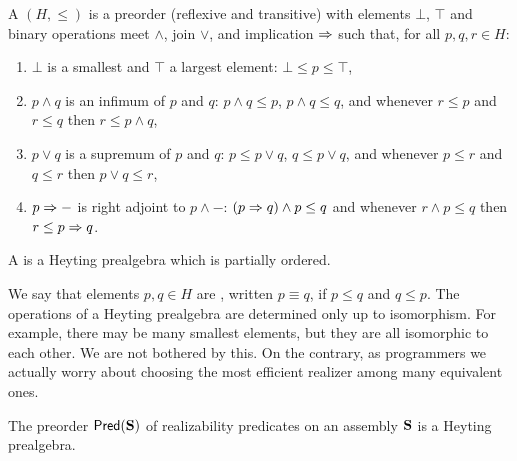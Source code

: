 \begin{definition}
  A  $(H, {\leq})$ is a preorder (reflexive
  and transitive) with elements $\bot$, $\top$ and binary operations
  meet $\land$, join $\lor$, and implication $\Rightarrow$ such that, for all
  $p, q, r \in H$:
  \begin{enumerate}
  \item $\bot$ is a smallest and $\top$ a largest element: $\bot \leq
    p \leq \top$,
  \item $p \land q$ is an infimum of $p$ and $q$: $p \land q \leq p$,
    $p \land q \leq q$, and whenever $r \leq p$ and $r \leq q$ then $r
    \leq p \land q$,
  \item $p \lor q$ is a supremum of $p$ and $q$: $p \leq p \lor q$, $q
    \leq p \lor q$, and whenever $p \leq r$ and $q \leq r$ then $p
    \lor q \leq r$,
  \item $p \Rightarrow {-}$ is right adjoint to $p \land {-}$: $(p \Rightarrow q)
    \land p \leq q$ and whenever $r \land p \leq q$ then $r \leq p
    \Rightarrow q$.
  \end{enumerate}
  A  is a Heyting prealgebra which is partially
  ordered.
\end{definition}

We say that elements $p, q \in H$ are , written $p
\equiv q$, if $p \leq q$ and $q \leq p$. The operations of a Heyting
prealgebra are determined only up to isomorphism. For example, there
may be many smallest elements, but they are all isomorphic to each
other. We are not bothered by this. On the contrary, as programmers we
actually worry about choosing the most efficient realizer among many
equivalent ones.

\begin{proposition}
  The preorder $\mathsf{Pred}(\mathbf{S})$ of realizability predicates on an
  assembly $\mathbf{S}$ is a Heyting prealgebra.
\end{proposition}

